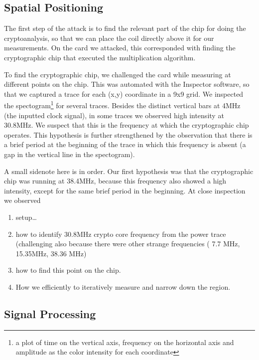 \documentclass{llncs}
\begin{document}
\subsection{Spatial Positioning}

The first step of the attack is to find the relevant part of the chip for doing the cryptoanalysis, so that we can place the coil directly above it for our measurements. On the card we attacked, this corresponded with finding the cryptographic chip that executed the multiplication algorithm.

To find the cryptographic chip, we challenged the card while measuring at different points on the chip. This was automated with the Inspector software, so that we captured a trace for each (x,y) coordinate in a 9x9 grid. We inspected the spectogram\footnote{a plot of time on the vertical axis, frequency on the horizontal axis and amplitude as the color intensity for each coordinate} for several traces. Besides the distinct vertical bars at 4MHz (the inputted clock signal), in some traces we observed high intensity at 30.8MHz. We suspect that this is the frequency at which the cryptographic chip operates. This hypothesis is further strengthened by the observation that there is a brief period at the beginning of the trace in which this frequency is absent (a gap in the vertical line in the spectogram).

A small sidenote here is in order. Our first hypothesis was that the cryptographic chip was running at 38.4MHz, because this frequency also showed a high intensity, except for the same brief period in the beginning. At close inspection we observed 

\begin{enumerate}
  \item  setup\ldots 
  \item how to identify 30.8MHz crypto core frequency from the power trace (challenging also because there were other strange frequencies ( 7.7 MHz, 15.35MHz, 38.36 MHz)
  \item how to find this point on the chip. 
  \item How we efficiently to iteratively measure and narrow down the region.
\end{enumerate}


\subsection{Signal Processing}

\end{document}
